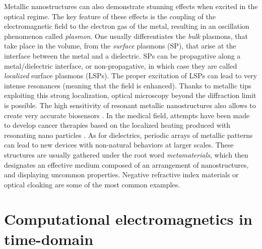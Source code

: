 Metallic nanostructures can also demonstrate stunning effects when excited in the optical regime. The key feature of these effects is the coupling of the electromagnetic field to the electron gas of the metal, resulting in an oscillation phenomenon called \emph{plasmon}. One usually differentiates the \emph{bulk} plasmons, that take place in the volume, from the \emph{surface} plasmons (SP), that arise at the interface between the metal and a dielectric. SPs can be propagative along a metal/dielectric interface, or non-propagative, in which case they are called \emph{localized} surface plasmons (LSPs). The proper excitation of LSPs can lead to very intense resonances (meaning that the field is enhanced). Thanks to metallic tips exploiting this strong localization, optical microscopy beyond the diffraction limit \cite{Novotny1} is possible. The high sensitivity of resonant metallic nanostructures also allows to create very accurate biosensors \cite{Chung1}. In the medical field, attempts have been made to develop cancer therapies based on the localized heating produced with resonating nano particles \cite{Sotiriou1}. As for dielectrics, periodic arrays of metallic patterns can lead to new devices with non-natural behaviors at larger scales. These structures are usually gathered under the root word \emph{metamaterials}, which then designates an effective medium composed of an arrangement of nanostructures, and displaying uncommon properties. Negative refractive index materials \cite{Dolling1} or optical cloaking \cite{Cai1} are some of the most common examples.

\section{Computational electromagnetics in time-domain}

